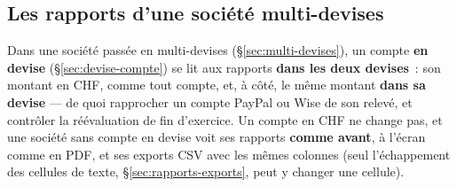 \documentclass[a4paper,11pt,oneside]{article}
\begin{document}
\subsection{Les rapports d'une société multi-devises}\label{sec:rapports-devise}

Dans une société passée en multi-devises (\S\ref{sec:multi-devises}), un compte \textbf{en devise}
(\S\ref{sec:devise-compte}) se lit aux rapports \textbf{dans les deux devises}~: son montant en CHF,
comme tout compte, et, à côté, le même montant \textbf{dans sa devise} --- de quoi rapprocher un
compte PayPal ou Wise de son relevé, et contrôler la réévaluation de fin d'exercice. Un compte en CHF
ne change pas, et une société sans compte en devise voit ses rapports \textbf{comme avant}, à l'écran
comme en PDF, et ses exports CSV avec les mêmes colonnes (seul l'échappement des cellules de texte,
\S\ref{sec:rapports-exports}, peut y changer une cellule).
\end{document}
